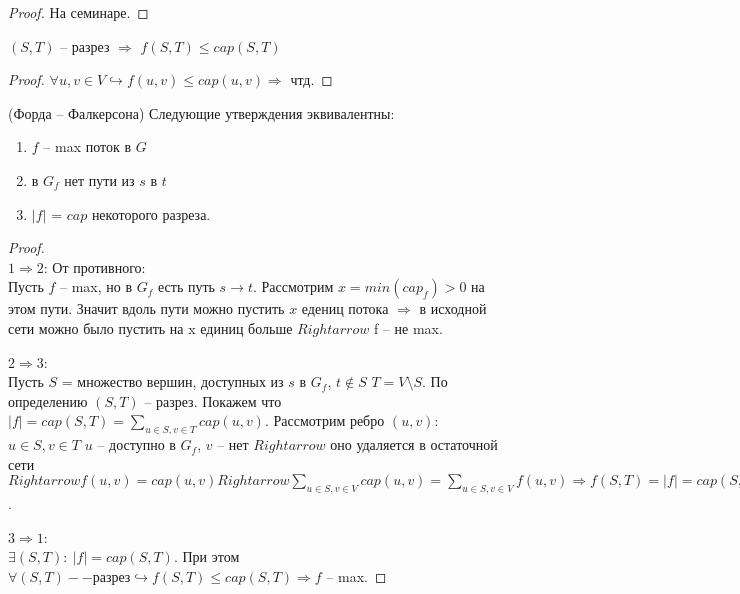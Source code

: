 \begin{proof}
	На семинаре.	
\end{proof}

\begin{lemma}
	$(S, T)$ -- разрез $\Rightarrow$ $f(S, T) \leq cap(S, T)$
\end{lemma}

\begin{proof}
	$\forall u, v \in V \hookrightarrow f(u, v) \leq cap(u, v) \Rightarrow$ чтд.
\end{proof}

\begin{theorem} (Форда -- Фалкерсона)
	Следующие утверждения эквивалентны:
	\begin{enumerate}
		\item $f$ -- max поток в $G$  
		\item в $G_f$ нет пути из  $s$ в  $t$
		\item $\lvert f \rvert$  = $cap$ некоторого разреза.
	\end{enumerate}
\end{theorem}

\begin{proof} \ \\
	$1 \Rightarrow 2$: От противного: \\
		Пусть  $f$ -- max, но в  $G_f$ есть путь  $s \rightarrow t$.
		Рассмотрим  $x = min(cap_f) > 0$ на этом пути.
		Значит вдоль пути можно пустить  $x$ едениц потока  $\Rightarrow$ в исходной сети можно было пустить на x единиц больше $Rightarrow$ f -- не  max.

	$2 \Rightarrow 3$: \\
		Пусть $S$ = множество вершин, доступных из  $s$ в  $G_f$,  $t \notin S$
		$T = V \setminus S$.
		По определению $(S, T)$ -- разрез.
		Покажем что $\lvert f \rvert = cap(S, T) = \sum\limits_{u \in S, v \in T} cap(u, v)$.
		Рассмотрим ребро $(u, v)$: $u \in S, v \in T$
		$u$ -- доступно в  $G_f$,  $v$ -- нет  $Rightarrow$ оно удаляется в остаточной сети $Rightarrow f(u, v) = cap(u, v) Rightarrow \sum\limits_{u \in S, v \in V} cap(u, v) = \sum\limits_{u \in S, v \in V} f(u, v) \Rightarrow f(S, T) = \lvert f \rvert = cap(S, T)$.

	$3 \Rightarrow 1$: \\
	$\exists (S, T):\ \lvert f \rvert = cap(S, T)$.
	При этом $\forall (S, T) -- разрез \hookrightarrow f(S, T) \leq cap(S, T) \Rightarrow f$  -- max.
\end{proof}

